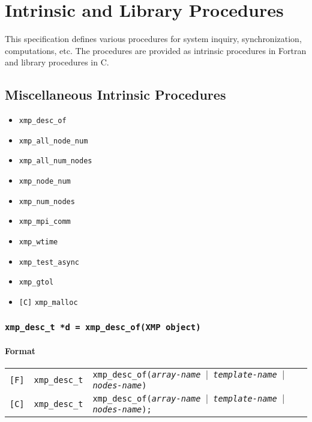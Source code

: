 \chapter{Intrinsic and Library Procedures}
\label{chap:Intrinsic and library procedures}

This specification defines various procedures for system inquiry,
synchronization, computations, etc. The procedures are provided as
intrinsic procedures in Fortran and library procedures in C.

\section{Miscellaneous Intrinsic Procedures}

\begin{itemize}
 \item {\tt xmp\_desc\_of}
 \item {\tt xmp\_all\_node\_num}
 \item {\tt xmp\_all\_num\_nodes}
 \item {\tt xmp\_node\_num}
 \item {\tt xmp\_num\_nodes}
 \item {\tt xmp\_mpi\_comm}
 \item {\tt xmp\_wtime}
 \item {\tt xmp\_test\_async}
 \item {\tt xmp\_gtol}
 \item \verb![C]! {\tt xmp\_malloc}
\end{itemize}

\vspace{0.3cm}

\subsection{\tt xmp\_desc\_t *d = xmp\_desc\_of(XMP object)}

\subsubsection*{Format}

\begin{tabular}{lll}

\verb![F]!&  {\tt xmp\_desc\_t}& {\tt xmp\_desc\_of({\it array-name} $\vert$ {\it template-name} 
$\vert$ {\it nodes-name})}\\

\verb![C]!&  {\tt xmp\_desc\_t}& {\tt xmp\_desc\_of({\it array-name} $\vert$ {\it template-name} 
$\vert$ {\it nodes-name});}

\end{tabular}

